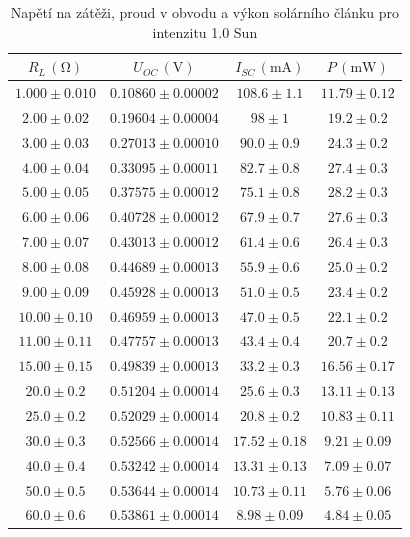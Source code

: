 \documentclass{../concepts/prepareprotokol} %
\begin{document}
\begin{table}[hbtp]
\centering
\caption{Napětí na zátěži, proud v obvodu a výkon solárního článku pro intenzitu 1.0 Sun}
\begin{tabular}{cccc}
 \toprule
 $R_L\, (\mathrm{\Omega})$ & $U_{OC}\, (\mathrm{V})$ & $I_{SC}\, (\mathrm{mA})$ & $P\, (\mathrm{mW})$ \\
 \midrule
 $1.000 \pm 0.010$ & $0.10860 \pm 0.00002$ & $108.6 \pm 1.1$ & $11.79 \pm 0.12$ \\
 $2.00 \pm 0.02$ & $0.19604 \pm 0.00004$ & $98 \pm 1$ & $19.2 \pm 0.2$ \\
 $3.00 \pm 0.03$ & $0.27013 \pm 0.00010$ & $90.0 \pm 0.9$ & $24.3 \pm 0.2$ \\
 $4.00 \pm 0.04$ & $0.33095 \pm 0.00011$ & $82.7 \pm 0.8$ & $27.4 \pm 0.3$ \\
 $5.00 \pm 0.05$ & $0.37575 \pm 0.00012$ & $75.1 \pm 0.8$ & $28.2 \pm 0.3$ \\
 $6.00 \pm 0.06$ & $0.40728 \pm 0.00012$ & $67.9 \pm 0.7$ & $27.6 \pm 0.3$ \\
 $7.00 \pm 0.07$ & $0.43013 \pm 0.00012$ & $61.4 \pm 0.6$ & $26.4 \pm 0.3$ \\
 $8.00 \pm 0.08$ & $0.44689 \pm 0.00013$ & $55.9 \pm 0.6$ & $25.0 \pm 0.2$ \\
 $9.00 \pm 0.09$ & $0.45928 \pm 0.00013$ & $51.0 \pm 0.5$ & $23.4 \pm 0.2$ \\
 $10.00 \pm 0.10$ & $0.46959 \pm 0.00013$ & $47.0 \pm 0.5$ & $22.1 \pm 0.2$ \\
 $11.00 \pm 0.11$ & $0.47757 \pm 0.00013$ & $43.4 \pm 0.4$ & $20.7 \pm 0.2$ \\
 $15.00 \pm 0.15$ & $0.49839 \pm 0.00013$ & $33.2 \pm 0.3$ & $16.56 \pm 0.17$ \\
 $20.0 \pm 0.2$ & $0.51204 \pm 0.00014$ & $25.6 \pm 0.3$ & $13.11 \pm 0.13$ \\
 $25.0 \pm 0.2$ & $0.52029 \pm 0.00014$ & $20.8 \pm 0.2$ & $10.83 \pm 0.11$ \\
 $30.0 \pm 0.3$ & $0.52566 \pm 0.00014$ & $17.52 \pm 0.18$ & $9.21 \pm 0.09$ \\
 $40.0 \pm 0.4$ & $0.53242 \pm 0.00014$ & $13.31 \pm 0.13$ & $7.09 \pm 0.07$ \\
 $50.0 \pm 0.5$ & $0.53644 \pm 0.00014$ & $10.73 \pm 0.11$ & $5.76 \pm 0.06$ \\
 $60.0 \pm 0.6$ & $0.53861 \pm 0.00014$ & $8.98 \pm 0.09$ & $4.84 \pm 0.05$ \\
 \bottomrule
\end{tabular}
\label{tab:100}
\end{table}
\end{document}

